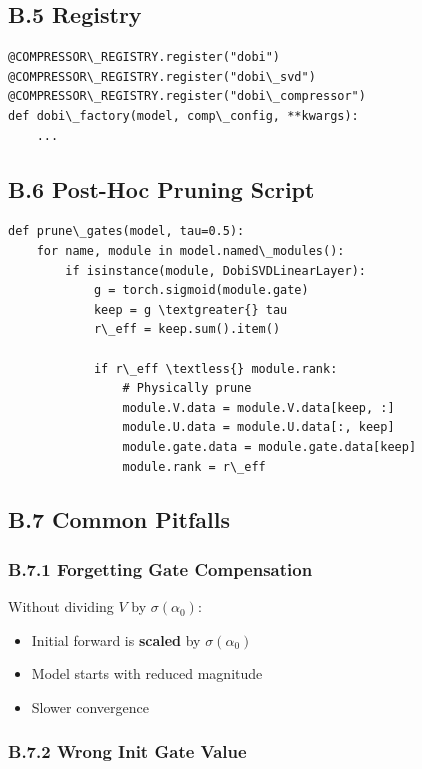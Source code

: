 \subsection{B.5 Registry}

\begin{lstlisting}
@COMPRESSOR\_REGISTRY.register("dobi")
@COMPRESSOR\_REGISTRY.register("dobi\_svd")
@COMPRESSOR\_REGISTRY.register("dobi\_compressor")
def dobi\_factory(model, comp\_config, **kwargs):
    ...
\end{lstlisting}

\subsection{B.6 Post-Hoc Pruning Script}

\begin{lstlisting}
def prune\_gates(model, tau=0.5):
    for name, module in model.named\_modules():
        if isinstance(module, DobiSVDLinearLayer):
            g = torch.sigmoid(module.gate)
            keep = g \textgreater{} tau
            r\_eff = keep.sum().item()
            
            if r\_eff \textless{} module.rank:
                # Physically prune
                module.V.data = module.V.data[keep, :]
                module.U.data = module.U.data[:, keep]
                module.gate.data = module.gate.data[keep]
                module.rank = r\_eff
\end{lstlisting}

\subsection{B.7 Common Pitfalls}

\subsubsection{B.7.1 Forgetting Gate Compensation}

Without dividing $V$ by $\sigma(\alpha_0)$:
\begin{itemize}
\item Initial forward is \textbf{scaled} by $\sigma(\alpha_0)$
\item Model starts with reduced magnitude
\item Slower convergence

\end{itemize}
\subsubsection{B.7.2 Wrong Init Gate Value}

